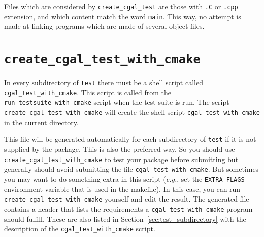 Files which are considered by {{\tt create\_cgal\_test}} are those with
{\tt .C} or {\tt .cpp} extension, and which content match the word {\tt main}.
This way, no attempt is made at linking programs which are made of several
object files.


\section{{\tt create\_cgal\_test\_with\_cmake}}
\label{sec:create_cgal_test_with_cmake}

In every subdirectory of {\tt test} there must be a shell script called
{\tt cgal\_test\_with\_cmake}. This script is called from the {\tt run\_testsuite\_with\_cmake}%
script when the test suite is run. The script
{{\tt create\_cgal\_test\_with\_cmake}}
will create the shell script {\tt cgal\_test\_with\_cmake} in the current directory.

This file will be generated automatically for each subdirectory of {\tt test} if
it is not supplied by the package. This is also the preferred way.
So you should use {\tt create\_cgal\_test\_with\_cmake} to test your package before
submitting but generally should avoid submitting the file {\tt cgal\_test\_with\_cmake}.
But sometimes you may want to do something extra in this script ({\em e.g.}, set
the {\tt EXTRA\_FLAGS}
environment variable that is used in the makefile).
In this case, you can run {\tt create\_cgal\_test\_with\_cmake} yourself and edit the result.
The generated file contains a header that lists the requirements a
{\tt cgal\_test\_with\_cmake} program should fulfill. These are also listed in
Section~\ref{sec:test_subdirectory} with the description of the
{\tt cgal\_test\_with\_cmake} script.

